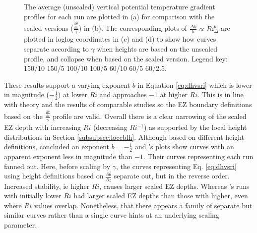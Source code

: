 \begin{figure}[htbp]
\begin{minipage}[b]{0.5\linewidth}
        \end{minipage}
        \caption{The average (unscaled) vertical potential temperature gradient profiles for each run are plotted in (a) for comparison with the scaled versions ($\frac{\frac{\partial \overline{\theta}}{\partial z}}{\gamma}$) in (b).  The corresponding plots of $\frac{\Delta h}{h} \propto Ri_{\Delta} ^{b}$ are plotted in loglog coordinates in (c) and (d) to show how curves separate according to $\gamma$ when heights are based on the unscaled profile, and collapse when based on the scaled version.  Legend key:{\color{red} } 150/10  150/5 \hspace{2mm} {\color{black} } 100/10 \hspace{2mm} {\color{black} } 100/5 \hspace{2mm} {\color{offyellow} } 60/10 \hspace{2mm} {\color{offyellow} } 60/5 \hspace{2mm} {\color{offyellow} } 60/2.5.}
        \label{fig:scaleddeltahinvri}
\end{figure}


These results support a varying exponent $b$ in Equation \ref{eq:dhvsri} which is lower in magnitude ($-\frac{1}{2}$) at lower $Ri$ and approaches $-1$ at higher $Ri$.  This is in line with theory and the results of comparable studies so the EZ boundary definitions based on the $\frac{\frac{\partial \overline{\theta}}{\partial z}}{\gamma}$ profile are valid.  Overall there is a clear narrowing of the scaled EZ depth with increasing $Ri$ (decreasing $Ri^{-1}$) as supported by the local height distributions in Section \ref{subsubsec:loccblh}.  Although based on different height definitions, \cite{FedConzMir04} concluded an exponent $b = -\frac{1}{2}$ and \cite{BrooksFowler2}'s plots show curves with an apparent exponent less in magnitude than $-1$.  Their curves representing each run fanned out.  Here, before scaling by $\gamma$, the curves representing Eq. \ref{eq:dhvsri} using height definitions based on $\frac{\partial \overline{\theta}}{\partial z}$ separate out, but in the reverse order.  Increased stability, ie higher $Ri$, causes larger scaled EZ depths.  Whereas \cite{BrooksFowler2}'s runs with initially lower $Ri$ had larger scaled EZ depths than those with higher, even where $Ri$ values overlap. Nonetheless, that there appears a family of separate but similar curves rather than a single curve hints at an underlying scaling parameter.\\     

